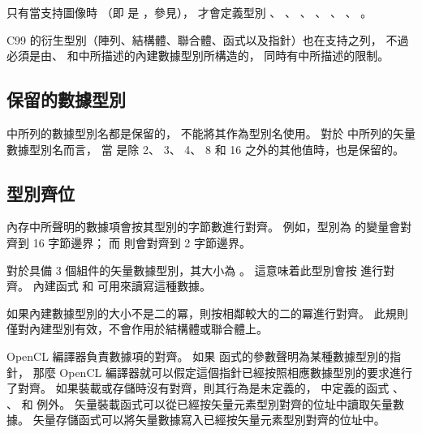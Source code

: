 \startnotepar
只有當支持圖像時
（即  是 ，參見），
才會定義型別 、 、 、
 、 、 、
 。
\stopnotepar

C99 的衍生型別（陣列、結構體、聯合體、函式以及指針）也在支持之列，
不過必須是由、
和中所描述的內建數據型別所構造的，
同時有中所描述的限制。

\subsection{保留的數據型別}

 中所列的數據型別名都是保留的，
不能將其作為型別名使用。
對於 中所列的矢量數據型別名而言，
當  是除 2、 3、 4、 8 和 16 之外的其他值時，也是保留的。

{}

\subsection[sec:alignmentOfTypes]{型別齊位}

內存中所聲明的數據項會按其型別的字節數進行對齊。
例如，型別為  的變量會對齊到 16 字節邊界；
而  則會對齊到 2 字節邊界。

對於具備 3 個組件的矢量數據型別，其大小為 。
這意味着此型別會按  進行對齊。
內建函式  和  可用來讀寫這種數據。

如果內建數據型別的大小不是二的冪，則按相鄰較大的二的冪進行對齊。
此規則僅對內建型別有效，不會作用於結構體或聯合體上。

OpenCL 編譯器負責數據項的對齊。
如果  函式的參數聲明為某種數據型別的指針，
那麼 OpenCL 編譯器就可以假定這個指針已經按照相應數據型別的要求進行了對齊。
如果裝載或存儲時沒有對齊，則其行為是未定義的，
中定義的函式 、 、
  和  例外。
矢量裝載函式可以從已經按矢量元素型別對齊的位址中讀取矢量數據。
矢量存儲函式可以將矢量數據寫入已經按矢量元素型別對齊的位址中。

